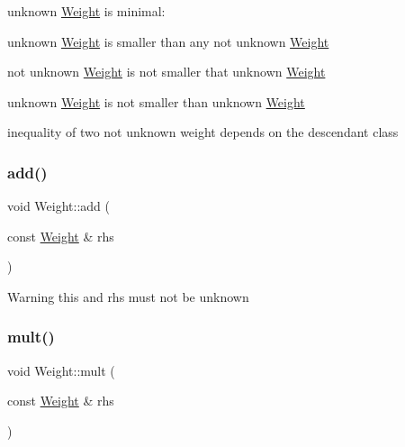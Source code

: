 \begin{DoxyItemize}
\item unknown \mbox{\hyperlink{classWeight}{Weight}} is minimal\+:
\item unknown \mbox{\hyperlink{classWeight}{Weight}} is smaller than any not unknown \mbox{\hyperlink{classWeight}{Weight}}
\item not unknown \mbox{\hyperlink{classWeight}{Weight}} is not smaller that unknown \mbox{\hyperlink{classWeight}{Weight}}
\item unknown \mbox{\hyperlink{classWeight}{Weight}} is not smaller than unknown \mbox{\hyperlink{classWeight}{Weight}}
\item inequality of two not unknown weight depends on the descendant class 
\end{DoxyItemize}\mbox{\label{group__weight_ga261db18abff49cac38bd02b8f7af94db}} 
\subsubsection{\texorpdfstring{add()}{add()}\hspace{0.1cm}{\footnotesize\ttfamily [5/5]}}
{\footnotesize\ttfamily void Weight\+::add (\begin{DoxyParamCaption}\item[{const \mbox{\hyperlink{classWeight}{Weight}} \&}]{rhs }\end{DoxyParamCaption})\hspace{0.3cm}{\ttfamily [protected]}}

\begin{DoxyWarning}{Warning}
this and rhs must not be unknown 
\end{DoxyWarning}
\mbox{\label{group__weight_ga7188f571e507d7f31b76de7faebdb78f}} 
\subsubsection{\texorpdfstring{mult()}{mult()}\hspace{0.1cm}{\footnotesize\ttfamily [5/5]}}
{\footnotesize\ttfamily void Weight\+::mult (\begin{DoxyParamCaption}\item[{const \mbox{\hyperlink{classWeight}{Weight}} \&}]{rhs }\end{DoxyParamCaption})\hspace{0.3cm}{\ttfamily [protected]}}


